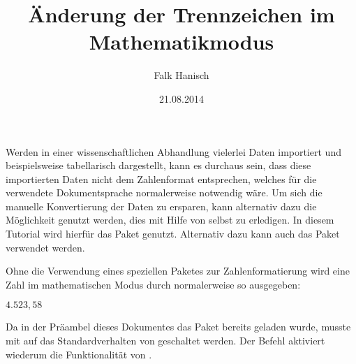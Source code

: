 \documentclass[english,ngerman]{tudscrartcl}
\begin{document}
\title{Änderung der Trennzeichen im Mathematikmodus}
\author{Falk Hanisch}
\date{21.08.2014}
\makeatletter
\begingroup%
  \def\and{, }%
  \let\thanks\@gobble%
  \let\footnote\@gobble%
\endgroup%
\makeatother
\StartTutorial
{}
%
Werden in einer wissenschaftlichen Abhandlung vielerlei Daten importiert und 
beispielsweise tabellarisch dargestellt, kann es durchaus sein, dass diese 
importierten Daten nicht dem Zahlenformat entsprechen, welches für die 
verwendete Dokumentsprache normalerweise notwendig wäre. Um sich die manuelle 
Konvertierung der Daten zu ersparen, kann alternativ dazu die Möglichkeit 
genutzt werden, dies mit Hilfe von  selbst zu erledigen. In 
diesem Tutorial wird hierfür das Paket  genutzt. Alternativ 
dazu kann auch das Paket  verwendet werden.

Ohne die Verwendung eines speziellen Paketes zur Zahlenformatierung wird eine 
Zahl im mathematischen Modus durch  normalerweise so 
ausgegeben: 
%
\begin{Tutorial}
\mathswapoff
\(4.523,58\)
\mathswapon
\end{Tutorial}
%
Da in der Präambel dieses Dokumentes das Paket  bereits 
geladen wurde, musste mit  auf das Standardverhalten von 
 geschaltet werden. Der Befehl  aktiviert 
wiederum die Funktionalität von .
\end{document}

